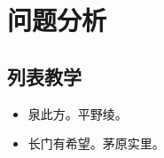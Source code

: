 \section{问题分析}

\subsection{列表教学}

\begin{itemize}
\item
  {\heiti 泉此方}。平野绫。
\item
  {\heiti 长门有希望}。茅原实里。
\end{itemize}




